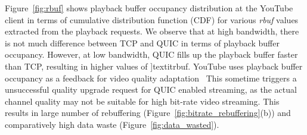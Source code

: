 Figure~\ref{fig:rbuf} shows playback buffer occupancy distribution at the YouTube client in terms of cumulative distribution function (CDF) for various \textit{rbuf} values extracted from the playback requests. We observe that at high bandwidth, there is not much difference between TCP and QUIC in terms of playback buffer occupancy. However, at low bandwidth, QUIC fills up the playback buffer faster than TCP, resulting in higher values of ]textit{rbuf}. 
YouTube uses playback buffer occupancy as a feedback for video quality adaptation~\cite{mondal2017youtube,krishnappa2013dashing}
This sometime triggers a unsuccessful quality upgrade request for QUIC enabled streaming, as the actual channel quality may not be suitable for high bit-rate video streaming. This results in large number of rebuffering (Figure~\ref{fig:bitrate_rebuffering}(b)) and comparatively high data waste (Figure~\ref{fig:data_wasted}). 



